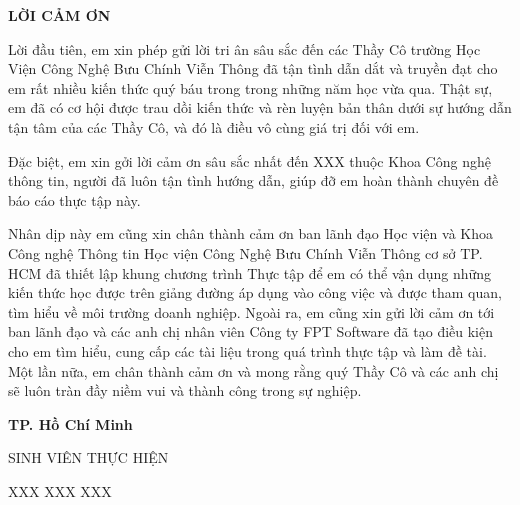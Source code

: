 \documentclass[report.tex]{subfiles}
\begin{document}

\begin{center}
    \textbf{LỜI CẢM ƠN}
\end{center}

Lời đầu tiên, em xin phép gửi lời tri ân sâu sắc đến các Thầy Cô trường Học Viện
Công Nghệ Bưu Chính Viễn Thông đã tận tình dẫn dắt và truyền đạt cho em rất nhiều kiến
thức quý báu trong trong những năm học vừa qua.
Thật sự, em đã có cơ hội được trau dồi kiến thức và rèn luyện bản thân dưới sự hướng dẫn tận tâm của các Thầy Cô, và đó là điều
vô cùng giá trị đối với em.

Đặc biệt, em xin gởi lời cảm ơn sâu sắc nhất đến XXX thuộc Khoa Công nghệ thông tin, người đã luôn tận tình hướng dẫn, giúp đỡ em hoàn thành chuyên đề báo cáo thực tập này.

Nhân dịp này em cũng xin chân thành cảm ơn ban lãnh đạo Học viện và Khoa Công nghệ Thông tin Học viện Công Nghệ Bưu Chính Viễn Thông cơ sở TP. HCM
đã thiết lập khung chương trình Thực tập để em có thể vận dụng những kiến thức học được trên giảng đường áp dụng vào công việc và được tham quan, tìm hiểu về môi trường doanh nghiệp.
Ngoài ra, em cũng xin gửi lời cảm ơn tới ban lãnh đạo và các anh chị nhân viên Công ty FPT Software đã tạo điều kiện cho em tìm hiểu, cung cấp các tài liệu trong quá trình thực tập và làm đề tài.
Một lần nữa, em chân thành cảm ơn và mong rằng quý Thầy Cô và các anh chị sẽ luôn tràn đầy niềm vui và thành công trong sự nghiệp.

\begin{flushright}
\textbf{TP. Hồ Chí Minh}
\end{flushright}

\begin{flushright}
SINH VIÊN THỰC HIỆN
\end{flushright}

\par\null\par

\begin{flushright}
XXX XXX XXX
\end{flushright}

\pagebreak
\end{document}
